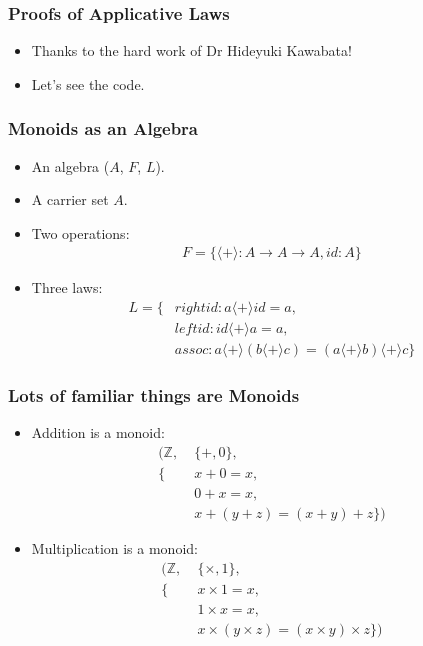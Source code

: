 \documentclass[hyperref={colorlinks = true,linkcolor = blue, citecolor = blue, urlcolor = blue}]{beamer}
\begin{document}
\begin{frame}[fragile]
  \frametitle{Proofs of Applicative Laws}
  \begin{itemize}
    \item Thanks to the hard work of Dr Hideyuki Kawabata!
    \item Let's see the code.
  \end{itemize}
\end{frame}

\begin{frame}[fragile]
  \frametitle{Monoids as an Algebra}
  \begin{itemize}
    \item An algebra ($A$, $F$, $L$).
    \item A carrier set $A$.
    \item Two operations: \begin{align*}
                        F = \{\langle+\rangle : A \rightarrow A \rightarrow A,
                              id : A \}
                          \end{align*}
    \item Three laws: \begin{align*}
       L = \{&rightid : a \langle+\rangle id = a, \\
             &leftid : id \langle+\rangle a = a, \\
             &assoc : a \langle+\rangle (b \langle+\rangle c) =
                     (a \langle+\rangle b) \langle+\rangle c \}                
                      \end{align*}
  \end{itemize}
\end{frame}

\begin{frame}[fragile]
  \frametitle{Lots of familiar things are Monoids}
  \begin{itemize}
    \item Addition is a monoid: \begin{align*}
                                (\mathbb{Z},\;&\{+,0\}, \\
                                  \{&x + 0 = x, \\
                                    &0 + x = x, \\
                                    &x + (y + z) = (x + y) + z \})
                                 \end{align*}
    \item Multiplication is a monoid: \begin{align*}
                                (\mathbb{Z},\;&\{\times,1\}, \\
                                  \{&x \times 1 = x, \\
                                    &1 \times x = x, \\
                                    &x \times (y \times z) = (x \times y) \times z \})
                                 \end{align*}
  \end{itemize}
\end{frame}
\end{document}
